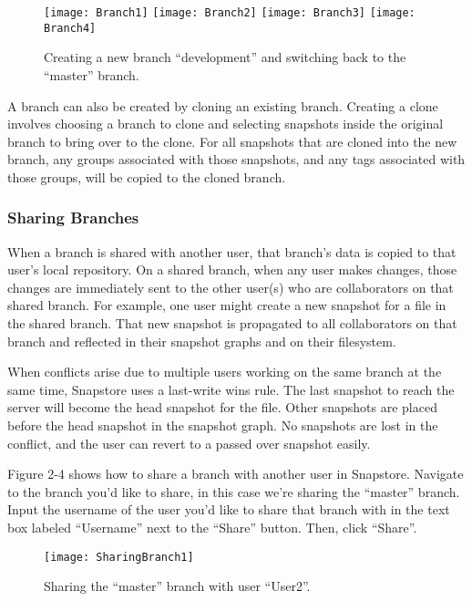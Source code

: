 \begin{figure}
\texttt{[image: Branch1]}
\texttt{[image: Branch2]}
\texttt{[image: Branch3]}
\texttt{[image: Branch4]}
\caption{Creating a new branch ``development'' and switching back to the ``master'' branch.}
\label{arm:fig1}
\end{figure}

A branch can also be created by cloning an existing branch. Creating a clone involves choosing a branch to clone and selecting snapshots inside the original branch to bring over to the clone. For all snapshots that are cloned into the new branch, any groups associated with those snapshots, and any tags associated with those groups, will be copied to the cloned branch.

\subsubsection{Sharing Branches}

When a branch is shared with another user, that branch's data is copied to that user's local repository. On a shared branch, when any user makes changes, those changes are immediately sent to the other user(s) who are collaborators on that shared branch. For example, one user might create a new snapshot for a file in the shared branch. That new snapshot is propagated to all collaborators on that branch and reflected in their snapshot graphs and on their filesystem.

When conflicts arise due to multiple users working on the same branch at the same time, Snapstore uses a last-write wins rule. The last snapshot to reach the server will become the head snapshot for the file. Other snapshots are placed before the head snapshot in the snapshot graph. No snapshots are lost in the conflict, and the user can revert to a passed over snapshot easily.

Figure 2-4 shows how to share a branch with another user in Snapstore. Navigate to the branch you'd like to share, in this case we're sharing the ``master'' branch. Input the username of the user you'd like to share that branch with in the text box labeled ``Username'' next to the ``Share'' button. Then, click ``Share''.

\begin{figure}
\begin{center}
\texttt{[image: SharingBranch1]}
\caption{Sharing the ``master'' branch with user ``User2''.}
\label{arm:fig1}
\end{center}
\end{figure}

